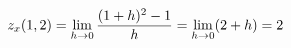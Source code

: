 \documentclass[preview]{standalone}
\begin{document}
\begin{align*}
\special{dvisvgm:raw <g id='unique000'>}z_x(1,2)=\lim_{h\to0}\frac{(1+h)^2-1}{h}=\lim_{h\to0}(2+h)=2\special{dvisvgm:raw </g>}
\end{align*}
\end{document}
